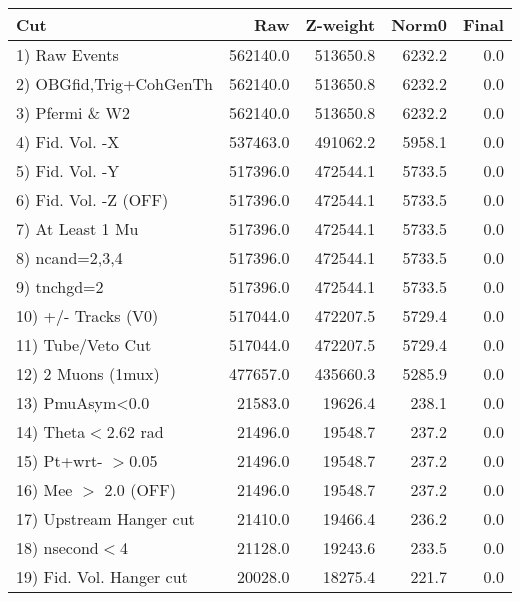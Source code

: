  \begin{table}[h!]\centering
 \begin{tabular}{||l||r|r|r|r||}
 \hline
 \hline
 Cut & Raw & Z-weight & Norm0 & Final \\
 \hline
  1) Raw Events           &    562140.0 &    513650.8 &      6232.2 &         0.0 \\
  2) OBGfid,Trig+CohGenTh &    562140.0 &    513650.8 &      6232.2 &         0.0 \\
  3) Pfermi \& W2         &    562140.0 &    513650.8 &      6232.2 &         0.0 \\
  4) Fid. Vol. -X         &    537463.0 &    491062.2 &      5958.1 &         0.0 \\
  5) Fid. Vol. -Y         &    517396.0 &    472544.1 &      5733.5 &         0.0 \\
  6) Fid. Vol. -Z (OFF)   &    517396.0 &    472544.1 &      5733.5 &         0.0 \\
  7) At Least 1 Mu        &    517396.0 &    472544.1 &      5733.5 &         0.0 \\
  8) ncand=2,3,4          &    517396.0 &    472544.1 &      5733.5 &         0.0 \\
  9) tnchgd=2             &    517396.0 &    472544.1 &      5733.5 &         0.0 \\
 10) +/- Tracks (V0)      &    517044.0 &    472207.5 &      5729.4 &         0.0 \\
 11) Tube/Veto Cut        &    517044.0 &    472207.5 &      5729.4 &         0.0 \\
 12) 2 Muons (1mux)       &    477657.0 &    435660.3 &      5285.9 &         0.0 \\
 13) PmuAsym<0.0          &     21583.0 &     19626.4 &       238.1 &         0.0 \\
 14) Theta$<$2.62 rad     &     21496.0 &     19548.7 &       237.2 &         0.0 \\
 15) Pt+wrt- $>$0.05      &     21496.0 &     19548.7 &       237.2 &         0.0 \\
 16) Mee $>$ 2.0  (OFF)   &     21496.0 &     19548.7 &       237.2 &         0.0 \\
 17) Upstream Hanger cut  &     21410.0 &     19466.4 &       236.2 &         0.0 \\
 18) nsecond$<$4          &     21128.0 &     19243.6 &       233.5 &         0.0 \\
 19) Fid. Vol. Hanger cut &     20028.0 &     18275.4 &       221.7 &         0.0 \\

\end{tabular}
\end{table}
